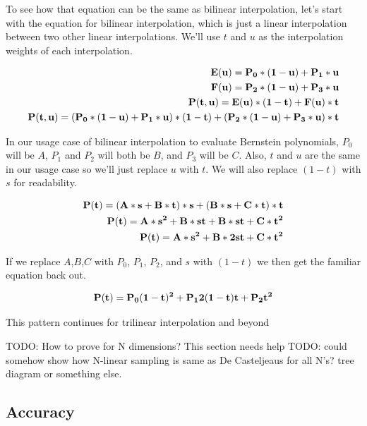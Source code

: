 \documentclass{jcgt}
\begin{document}
To see how that equation can be the same as bilinear interpolation, let's start with the equation for bilinear interpolation, which is just a linear interpolation between two other linear interpolations.  We'll use $t$ and $u$ as the interpolation weights of each interpolation.

\begin{equation}
\begin{split}
\bf{E(u)} = P_0*(1-u) + P_1*u \\
\bf{F(u)} = P_2*(1-u) + P_3*u \\
\bf{P(t,u)} = E(u)*(1-t) + F(u)*t \\
\bf{P(t,u)} = (P_0*(1-u) + P_1*u)*(1-t) + (P_2*(1-u) + P_3*u)*t
\end{split}
\label{eqn:bilinearinterpolation}
\end{equation}

In our usage case of bilinear interpolation to evaluate Bernstein polynomials, $P_0$ will be $A$, $P_1$ and $P_2$ will both be $B$, and $P_3$ will be $C$.  Also, $t$ and $u$ are the same in our usage case so we'll just replace $u$ with $t$.  We will also replace $(1-t)$ with $s$ for readability.

\begin{equation}
\begin{split}
\bf{P(t)} = (A*s+B*t)*s + (B*s+C*t)*t \\
\bf{P(t)} = A*s^2+B*st + B*st+C*t^2 \\
\bf{P(t)} = A*s^2+B*2st+C*t^2
\end{split}
\label{eqn:bilinearinterpolation2}
\end{equation}

If we replace $A$,$B$,$C$ with $P_0$, $P_1$, $P_2$, and $s$ with $(1-t)$ we then get the familiar equation back out.

\begin{equation}
\bf{P(t)} = P_0(1-t)^2+P_12(1-t)t+P_2t^2
\label{eqn:bilinearinterpolation3}
\end{equation}

This pattern continues for trilinear interpolation and beyond

TODO: How to prove for N dimensions?  This section needs help
TODO: could somehow show how N-linear sampling is same as De Casteljeaus for all N's? tree diagram or something else.

\subsection{Accuracy}
\end{document}
